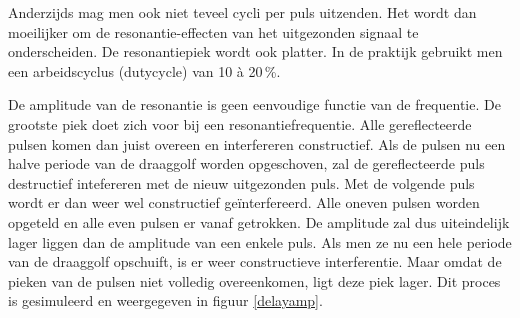 
Anderzijds mag men ook niet teveel cycli per puls uitzenden. Het wordt dan 
moeilijker om de resonantie-effecten van het uitgezonden signaal te 
onderscheiden. De resonantiepiek wordt ook platter. In de praktijk gebruikt men 
een arbeidscyclus (dutycycle) van 10 \`a 20\,\%.

De amplitude van de resonantie is geen eenvoudige functie van de frequentie.  
De grootste piek doet zich voor bij een resonantiefrequentie. Alle 
gereflecteerde pulsen komen dan juist overeen en interfereren constructief. Als 
de pulsen nu een halve periode van de draaggolf worden opgeschoven, zal de 
gereflecteerde puls destructief intefereren met de nieuw uitgezonden puls. Met 
de volgende puls wordt er dan weer wel constructief ge\"interfereerd. Alle 
oneven pulsen worden opgeteld en alle even pulsen er vanaf getrokken. De 
amplitude zal dus uiteindelijk lager liggen dan de amplitude van een enkele 
puls.  Als men ze nu een hele periode van de draaggolf opschuift, is er weer 
constructieve interferentie. Maar omdat de pieken van de pulsen niet volledig 
overeenkomen, ligt deze piek lager. Dit proces is gesimuleerd en weergegeven in 
figuur \ref{delayamp}.


